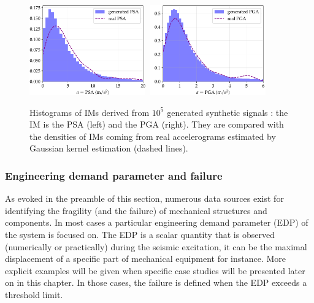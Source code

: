 \begin{figure}[h]
    \centering
    \includegraphics[width=5cm]{figures/intro-frags/PSA_density.pdf}\ 
    \includegraphics[width=5cm]{figures/intro-frags/PGA_density.pdf}
    \caption{Histograms of IMs derived from $10^5$ generated synthetic signals : the IM is the PSA (left) and the PGA (right). They are compared with the densities of IMs coming from real accelerograms estimated by Gaussian kernel estimation (dashed lines).} %
    \label{fig:intro-frags:IM-density}
\end{figure}














\subsubsection{Engineering demand parameter and failure}


As evoked in the preamble of this section, numerous data sources exist for identifying the fragility (and the failure) of mechanical structures and components.
In most cases a particular engineering demand parameter (EDP) of the system is focused on. The EDP is a scalar quantity that is observed (numerically or practically) during the seismic excitation, it can be the maximal displacement of a specific part of mechanical equipment for instance. More explicit examples will be given when specific case studies will be presented later on in this chapter. 
In those cases, the failure is defined when the EDP exceeds a threshold limit.

